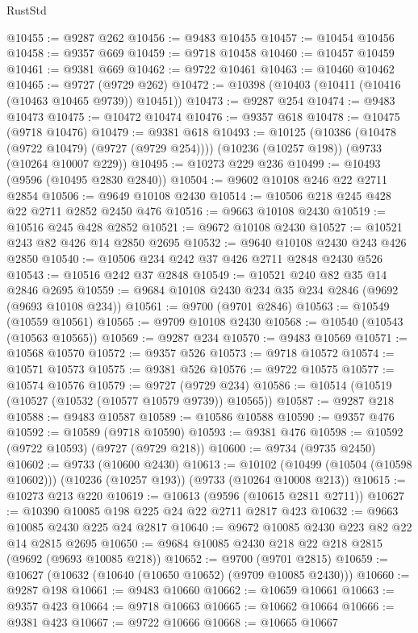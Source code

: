 \begin{lexlean}{RustStd}
\begin{coremodule}
@10455 := @9287 @262
@10456 := @9483 @10455
@10457 := @10454 @10456
@10458 := @9357 @669
@10459 := @9718 @10458
@10460 := @10457 @10459
@10461 := @9381 @669
@10462 := @9722 @10461
@10463 := @10460 @10462
@10465 := @9727 (@9729 @262)
@10472 := @10398 (@10403 (@10411 (@10416 (@10463 @10465 @9739)) @10451))
@10473 := @9287 @254
@10474 := @9483 @10473
@10475 := @10472 @10474
@10476 := @9357 @618
@10478 := @10475 (@9718 @10476)
@10479 := @9381 @618
@10493 := @10125
    (@10386 (@10478 (@9722 @10479) (@9727 (@9729 @254))))
    (@10236 (@10257 @198))
    (@9733 (@10264 @10007 @229))
@10495 := @10273 @229 @236
@10499 := @10493 (@9596 (@10495 @2830 @2840))
@10504 := @9602 @10108 @246 @22 @2711 @2854
@10506 := @9649 @10108 @2430
@10514 := @10506 @218 @245 @428 @22 @2711 @2852 @2450 @476
@10516 := @9663 @10108 @2430
@10519 := @10516 @245 @428 @2852
@10521 := @9672 @10108 @2430
@10527 := @10521 @243 @82 @426 @14 @2850 @2695
@10532 := @9640 @10108 @2430 @243 @426 @2850
@10540 := @10506 @234 @242 @37 @426 @2711 @2848 @2430 @526
@10543 := @10516 @242 @37 @2848
@10549 := @10521 @240 @82 @35 @14 @2846 @2695
@10559 := @9684 @10108 @2430 @234 @35 @234 @2846 (@9692 (@9693 @10108 @234))
@10561 := @9700 (@9701 @2846)
@10563 := @10549 (@10559 @10561)
@10565 := @9709 @10108 @2430
@10568 := @10540 (@10543 (@10563 @10565))
@10569 := @9287 @234
@10570 := @9483 @10569
@10571 := @10568 @10570
@10572 := @9357 @526
@10573 := @9718 @10572
@10574 := @10571 @10573
@10575 := @9381 @526
@10576 := @9722 @10575
@10577 := @10574 @10576
@10579 := @9727 (@9729 @234)
@10586 := @10514 (@10519 (@10527 (@10532 (@10577 @10579 @9739)) @10565))
@10587 := @9287 @218
@10588 := @9483 @10587
@10589 := @10586 @10588
@10590 := @9357 @476
@10592 := @10589 (@9718 @10590)
@10593 := @9381 @476
@10598 := @10592 (@9722 @10593) (@9727 (@9729 @218))
@10600 := @9734 (@9735 @2450)
@10602 := @9733 (@10600 @2430)
@10613 := @10102
    (@10499 (@10504 (@10598 @10602)))
    (@10236 (@10257 @193))
    (@9733 (@10264 @10008 @213))
@10615 := @10273 @213 @220
@10619 := @10613 (@9596 (@10615 @2811 @2711))
@10627 := @10390 @10085 @198 @225 @24 @22 @2711 @2817 @423
@10632 := @9663 @10085 @2430 @225 @24 @2817
@10640 := @9672 @10085 @2430 @223 @82 @22 @14 @2815 @2695
@10650 := @9684 @10085 @2430 @218 @22 @218 @2815 (@9692 (@9693 @10085 @218))
@10652 := @9700 (@9701 @2815)
@10659 := @10627 (@10632 (@10640 (@10650 @10652) (@9709 @10085 @2430)))
@10660 := @9287 @198
@10661 := @9483 @10660
@10662 := @10659 @10661
@10663 := @9357 @423
@10664 := @9718 @10663
@10665 := @10662 @10664
@10666 := @9381 @423
@10667 := @9722 @10666
@10668 := @10665 @10667

\end{coremodule}
\end{lexlean}
